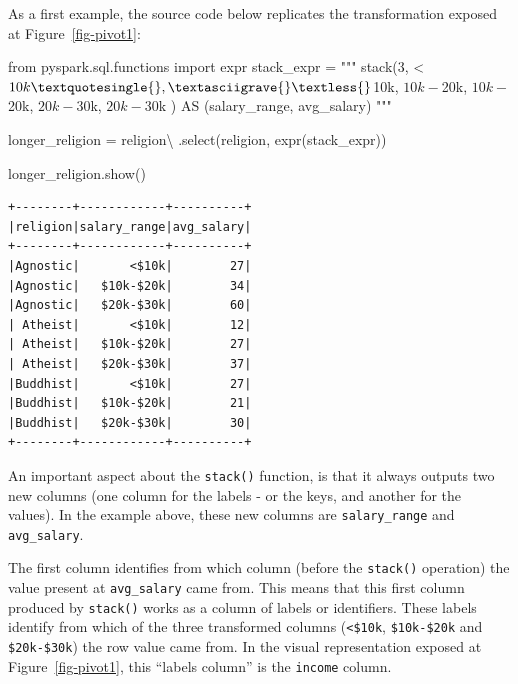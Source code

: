 \documentclass[
  11pt,
  letterpaper,
  DIV=11,
  numbers=noendperiod]{scrreprt}
\newenvironment{Shaded}{\begin{snugshade}}{\end{snugshade}}
\newcommand{\ImportTok}[1]{\textcolor[rgb]{0.00,0.46,0.62}{#1}}
\newcommand{\NormalTok}[1]{\textcolor[rgb]{0.00,0.23,0.31}{#1}}
\newcommand{\OperatorTok}[1]{\textcolor[rgb]{0.37,0.37,0.37}{#1}}
\newcommand{\StringTok}[1]{\textcolor[rgb]{0.13,0.47,0.30}{#1}}
\begin{document}
As a first example, the source code below replicates the transformation
exposed at Figure~\ref{fig-pivot1}:

\begin{Shaded}
\begin{Highlighting}[]
\ImportTok{from}\NormalTok{ pyspark.sql.functions }\ImportTok{import}\NormalTok{ expr}
\NormalTok{stack\_expr }\OperatorTok{=} \StringTok{"""}
\StringTok{stack(3,}
\StringTok{    \textquotesingle{}\textless{}$10k\textquotesingle{}, \textasciigrave{}\textless{}$10k\textasciigrave{},}
\StringTok{    \textquotesingle{}$10k{-}$20k\textquotesingle{}, \textasciigrave{}$10k{-}$20k\textasciigrave{},}
\StringTok{    \textquotesingle{}$20k{-}$30k\textquotesingle{}, \textasciigrave{}$20k{-}$30k\textasciigrave{}}
\StringTok{) AS (salary\_range, avg\_salary)}
\StringTok{"""}

\NormalTok{longer\_religion }\OperatorTok{=}\NormalTok{ religion}\OperatorTok{\textbackslash{}}
\NormalTok{    .select(}\StringTok{\textquotesingle{}religion\textquotesingle{}}\NormalTok{, expr(stack\_expr))}

\NormalTok{longer\_religion.show()}
\end{Highlighting}
\end{Shaded}

\begin{verbatim}
+--------+------------+----------+
|religion|salary_range|avg_salary|
+--------+------------+----------+
|Agnostic|       <$10k|        27|
|Agnostic|   $10k-$20k|        34|
|Agnostic|   $20k-$30k|        60|
| Atheist|       <$10k|        12|
| Atheist|   $10k-$20k|        27|
| Atheist|   $20k-$30k|        37|
|Buddhist|       <$10k|        27|
|Buddhist|   $10k-$20k|        21|
|Buddhist|   $20k-$30k|        30|
+--------+------------+----------+
\end{verbatim}

An important aspect about the \texttt{stack()} function, is that it
always outputs two new columns (one column for the labels - or the keys,
and another for the values). In the example above, these new columns are
\texttt{salary\_range} and \texttt{avg\_salary}.

The first column identifies from which column (before the
\texttt{stack()} operation) the value present at \texttt{avg\_salary}
came from. This means that this first column produced by
\texttt{stack()} works as a column of labels or identifiers. These
labels identify from which of the three transformed columns
(\texttt{\textless{}\$10k}, \texttt{\$10k-\$20k} and
\texttt{\$20k-\$30k}) the row value came from. In the visual
representation exposed at Figure~\ref{fig-pivot1}, this ``labels
column'' is the \texttt{income} column.
\end{document}
